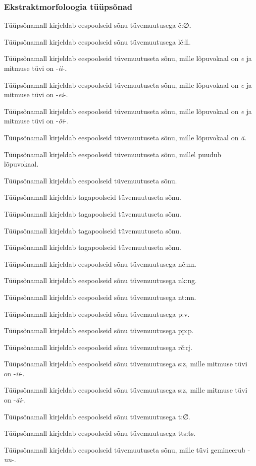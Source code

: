 \documentclass[12pt,a4paper]{article}
\begin{document}
\subsubsection*{Ekstraktmorfoloogia tüüpsõnad}
\vspace{-3.5em}

Tüüpsõna\-mall kirjeldab eespoolseid sõnu tüvemuutusega č:∅.

Tüüpsõna\-mall kirjeldab eespoolseid sõnu tüvemuutusega lč:ll.

Tüüpsõna\-mall kirjeldab eespoolseid tüvemuutuseta sõnu, mille lõpuvokaal on \textit{e} ja mitmuse tüvi on -\textit{ii}-.

Tüüpsõna\-mall kirjeldab eespoolseid tüvemuutuseta sõnu, mille lõpuvokaal on \textit{e} ja mitmuse tüvi on -\textit{ei}-.

Tüüpsõna\-mall kirjeldab eespoolseid tüvemuutuseta sõnu, mille lõpuvokaal on \textit{e} ja mitmuse tüvi on -\textit{öi}-.

Tüüpsõna\-mall kirjeldab eespoolseid tüvemuutuseta sõnu, mille lõpuvokaal on \textit{ä}.

Tüüpsõna\-mall kirjeldab eespoolseid tüvemuutuseta sõnu, millel puudub lõpuvokaal.

Tüüpsõna\-mall kirjeldab eespoolseid tüvemuutuseta sõnu.

Tüüpsõna\-mall kirjeldab tagapoolseid tüvemuutuseta sõnu.

Tüüpsõna\-mall kirjeldab tagapoolseid tüvemuutuseta sõnu.

Tüüpsõna\-mall kirjeldab tagapoolseid tüvemuutuseta sõnu.

Tüüpsõna\-mall kirjeldab tagapoolseid tüvemuutuseta sõnu. %

Tüüpsõna\-mall kirjeldab eespoolseid sõnu tüvemuutusega nč:nn.

Tüüpsõna\-mall kirjeldab eespoolseid sõnu tüvemuutusega nk:ng.

Tüüpsõna\-mall kirjeldab eespoolseid sõnu tüvemuutusega nt:nn.

Tüüpsõna\-mall kirjeldab eespoolseid sõnu tüvemuutusega p:v.

Tüüpsõna\-mall kirjeldab eespoolseid sõnu tüvemuutusega pp:p.

Tüüpsõna\-mall kirjeldab eespoolseid sõnu tüvemuutusega rč:rj.

Tüüpsõna\-mall kirjeldab eespoolseid sõnu tüvemuutusega s:z, mille mitmuse tüvi on -\textit{ii}-.

Tüüpsõna\-mall kirjeldab eespoolseid sõnu tüvemuutusega s:z, mille mitmuse tüvi on -\textit{äi}-.

Tüüpsõna\-mall kirjeldab eespoolseid sõnu tüvemuutusega t:∅.

Tüüpsõna\-mall kirjeldab eespoolseid sõnu tüvemuutusega tts:ts.

Tüüpsõna\-mall kirjeldab eespoolseid tüvemuutuseta sõnu, mille tüvi gemineerub -\textit{nn}-.

\end{document}
